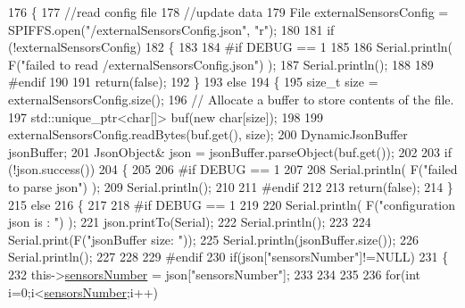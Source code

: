 \begin{DoxyCode}
176 \{
177     \textcolor{comment}{//read config file}
178     \textcolor{comment}{//update data}
179     File externalSensorsConfig = SPIFFS.open(\textcolor{stringliteral}{"/externalSensorsConfig.json"}, \textcolor{stringliteral}{"r"});
180 
181     \textcolor{keywordflow}{if} (!externalSensorsConfig) 
182     \{
183     
184 \textcolor{preprocessor}{    #if DEBUG == 1}
185         
186         Serial.println( F(\textcolor{stringliteral}{"failed to read /externalSensorsConfig.json"}) );
187         Serial.println();
188     
189 \textcolor{preprocessor}{    #endif}
190         
191         \textcolor{keywordflow}{return}(\textcolor{keyword}{false});
192     \}
193     \textcolor{keywordflow}{else}
194     \{
195         \textcolor{keywordtype}{size\_t} size = externalSensorsConfig.size();
196         \textcolor{comment}{// Allocate a buffer to store contents of the file.}
197         std::unique\_ptr<char[]> buf(\textcolor{keyword}{new} \textcolor{keywordtype}{char}[size]);
198 
199         externalSensorsConfig.readBytes(buf.get(), size);
200         DynamicJsonBuffer jsonBuffer;
201         JsonObject& json = jsonBuffer.parseObject(buf.get());
202 
203         \textcolor{keywordflow}{if} (!json.success()) 
204         \{
205         
206 \textcolor{preprocessor}{        #if DEBUG == 1 }
207 
208             Serial.println( F(\textcolor{stringliteral}{"failed to parse json"}) );
209             Serial.println();
210         
211 \textcolor{preprocessor}{        #endif}
212 
213             \textcolor{keywordflow}{return}(\textcolor{keyword}{false});
214         \} 
215         \textcolor{keywordflow}{else}
216         \{
217         
218 \textcolor{preprocessor}{        #if DEBUG == 1 }
219     
220             Serial.println( F(\textcolor{stringliteral}{"configuration json is : "}) );
221             json.printTo(Serial);
222             Serial.println();
223 
224             Serial.print(F(\textcolor{stringliteral}{"jsonBuffer size: "}));
225             Serial.println(jsonBuffer.size());
226             Serial.println();
227 
228         
229 \textcolor{preprocessor}{        #endif          }
230             \textcolor{keywordflow}{if}(json[\textcolor{stringliteral}{"sensorsNumber"}]!=NULL)
231             \{
232                 this->\hyperlink{class_external_sensors_a58e4fbf9adeae787d92be5fa33043b5d}{sensorsNumber} = json[\textcolor{stringliteral}{"sensorsNumber"}];
233                 
234                 
235 
236                 \textcolor{keywordflow}{for}(\textcolor{keywordtype}{int} i=0;i<\hyperlink{class_external_sensors_a58e4fbf9adeae787d92be5fa33043b5d}{sensorsNumber};i++)

\end{DoxyCode}
